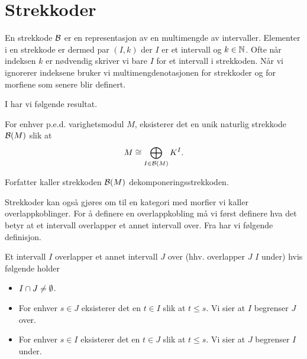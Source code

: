 \section{Strekkoder}
En strekkode $\mathcal{B}$ er en representasjon av en multimengde
av intervaller. Elementer i en strekkode er dermed par
$(I,k)$ der $I$ er et intervall og $k\in\mathbb{N}$. Ofte når
indeksen $k$ er nødvendig skriver vi bare $I$ for et
intervall i strekkoden. Når vi ignorerer indeksene bruker vi multimengdenotasjonen for
strekkoder og for morfiene som senere blir definert.

I \citep[teorem 2.4]{Bauer2020} har vi følgende resultat.
\begin{teorem}\label{trm:DekompBark}
  For enhver p.e.d. varighetsmodul $M$, eksisterer det en
  unik naturlig strekkode $\mathcal{B}(M)$ slik at
  \[M\cong \bigoplus_{I\in\mathcal{B}(M)} K^I.\]
\end{teorem}
Forfatter kaller strekkoden $\mathcal{B}(M)$
dekomponeringsstrekkoden.

%

Strekkoder kan også gjøres om til en kategori med morfier
vi kaller overlappkoblinger. For å definere en overlappkobling
må vi først definere hva det betyr at et intervall
overlapper et annet intervall over. Fra \citep[seksjon
2.3]{Bauer2020}
har vi følgende definisjon.

\begin{definisjon}
    Et intervall $I$ overlapper et annet intervall $J$
    over (hhv. overlapper $J$  $I$ under) hvis følgende
    holder
    \begin{itemize}
        \item $I\cap J\neq\emptyset$.
        \item For enhver $s\in J$ eksisterer det en $t\in I$ slik at $t\leq s$. Vi sier at $I$ begrenser $J$ over.
        \item For enhver $s\in I$ eksisterer det en $t\in J$ slik at $t\leq s$. Vi sier at $J$ begrenser $I$ under.
    \end{itemize}
\end{definisjon}

